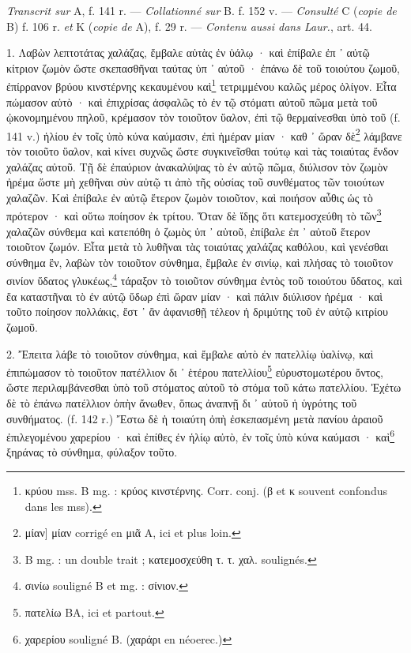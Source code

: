 \documentclass[a4paper, 11pt, oneside, polutonikogreek, french]{article}
\begin{document}
\emph{Transcrit sur} A, f. 141 r. --- \emph{Collationné sur} B. f. 152 v. --- \emph{Consulté} C (\emph{copie de} B) f. 106 r. \emph{et} K (\emph{copie de} A), f. 29 r. --- \emph{Contenu aussi dans Laur.}, art. 44.

\bigskip

1. Λαβὼν λεπτοτάτας χαλάζας, ἔμβαλε αὐτὰς ἐν ὑάλῳ · καὶ ἐπίβαλε ἐπ ᾽ αὐτῷ κίτριον ζωμὸν ὥστε σκεπασθῆναι ταύτας ὐπ ᾽ αὐτοῦ · ἐπάνω δὲ τοῦ τοιούτου ζωμοῦ, ἐπίρρανον βρύου κινστέρνης κεκαυμένου καὶ\footnote{κρύου mss. B mg. : κρύος κινστέρνης. Corr. conj. (β et κ souvent confondus dans les mss).} τετριμμένου καλῶς μέρος ὀλίγον. Εἶτα πώμασον αὐτὸ · καὶ ἐπιχρίσας ἀσφαλῶς τὸ ἐν τῷ στόματι αὐτοῦ πῶμα μετὰ τοῦ ᾠκονομημένου πηλοῦ, κρέμασον τὸν τοιοῦτον ὕαλον, ἐπὶ τῷ θερμαίνεσθαι ὑπὸ τοῦ (f. 141 v.) ἡλίου ἐν τοῖς ὑπὸ κύνα καύμασιν, ἐπὶ ἡμέραν μίαν · καθ ᾽ ὥραν δὲ\footnote{μίαν] μίαν corrigé en μιᾶ A, ici et plus loin.} λάμβανε τὸν τοιοῦτο ὕαλον, καὶ κίνει συχνῶς ὥστε συγκινεῖσθαι τούτῳ καὶ τὰς τοιαύτας ἔνδον χαλάζας αὐτοῦ. Τῇ δὲ ἐπαύριον ἀνακαλύψας τὸ ἐν αὐτῷ πῶμα, διύλισον τὸν ζωμὸν ἠρέμα ὥστε μὴ χεθῆναι σὺν αὐτῷ τι ἀπὸ τῆς οὐσίας τοῦ συνθέματος τῶν τοιούτων χαλαζῶν. Καὶ ἐπίβαλε ἐν αὐτῷ ἕτερον ζωμὸν τοιοῦτον, καὶ ποιήσον αὖθις ὡς τὸ πρότερον · καὶ οὕτω ποίησον ἐκ τρίτου. Ὅταν δὲ ἴδῃς ὅτι κατεμοσχεύθη τὸ τῶν\footnote{B mg. : un double trait ; κατεμοσχεύθη τ. τ. χαλ. soulignés.} χαλαζῶν σύνθεμα καὶ κατεπόθη ὁ ζωμὸς ὑπ ᾽ αὐτοῦ, ἐπίβαλε ἐπ ᾽ αὐτοῦ ἕτερον τοιοῦτον ζωμόν. Εἶτα μετὰ τὸ λυθῆναι τὰς τοιαύτας χαλάζας καθόλου, καὶ γενέσθαι σύνθημα ἓν, λαβὼν τὸν τοιοῦτον σύνθημα, ἔμβαλε ἐν σινίῳ, καὶ πλήσας τὸ τοιοῦτον σινίον ὕδατος γλυκέως,\footnote{σινίω souligné B et mg. : σίνιον.} τάραξον τὸ τοιοῦτον σύνθημα ἐντὸς τοῦ τοιούτου ὕδατος, καὶ ἔα καταστῆναι τὸ ἐν αὐτῷ ὕδωρ ἐπὶ ὥραν μίαν · καὶ πάλιν διύλισον ἠρέμα · καὶ τοῦτο ποίησον πολλάκις, ἔστ ᾽ ἂν ἀφανισθῇ τέλεον ἡ δριμύτης τοῦ ἐν αὐτῷ κιτρίου ζωμοῦ.

2. Ἔπειτα λάβε τὸ τοιοῦτον σύνθημα, καὶ ἔμβαλε αὐτὸ ἐν πατελλίῳ ὑαλίνῳ, καὶ ἐπιπώμασον τὸ τοιοῦτον πατέλλιον δι ᾽ ἑτέρου πατελλίου\footnote{πατελίω BA, ici et partout.} εὐρυστομωτέρου ὄντος, ὥστε περιλαμβάνεσθαι ὑπὸ τοῦ στόματος αὐτοῦ τὸ στόμα τοῦ κάτω πατελλίου. Ἐχέτω δὲ τὸ ἐπάνω πατέλλιον ὀπὴν ἄνωθεν, ὅπως ἀναπνῇ δι ᾽ αὐτοῦ ἡ ὑγρότης τοῦ συνθήματος. (f. 142 r.) Ἔστω δὲ ἡ τοιαύτη ὀπὴ ἐσκεπασμένη μετὰ πανίου ἀραιοῦ ἐπιλεγομένου χαρερίου · καὶ ἐπίθες ἐν ἡλίῳ αὐτὸ, ἐν τοῖς ὑπὸ κύνα καύμασι · καὶ\footnote{χαρερίου souligné B. (χαράρι en néoerec.)} ξηράνας τὸ σύνθημα, φύλαξον τοῦτο.
\end{document}
